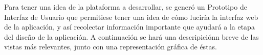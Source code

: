 \documentclass{memoria}
\begin{document}




Para tener una idea de la plataforma a desarrollar, se generó un Prototipo de Interfaz de Usuario que permitiese tener una idea de cómo luciría la interfaz web de la aplicación, y así recolectar información importante que ayudará a la etapa del diseño de la aplicación. A continuación se hará una descripiciónn breve de las vistas más relevantes, junto con una representación gráfica de éstas.

\end{document}
